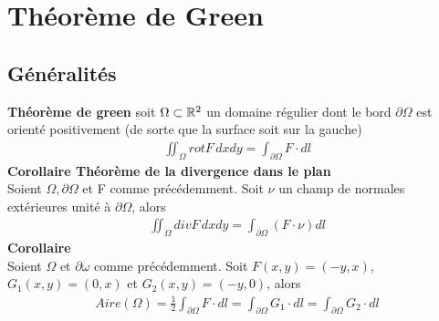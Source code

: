 \chapter[Théorème de Green]{Théorème de Green}

\section{Généralités}
\begin{myTheorem}
	{\bf Théorème de green} soit $\Omega \subset \mathbb{R}^2$ un domaine régulier dont le bord $\partial\Omega$ est orienté positivement (de sorte que la surface soit sur la gauche)
	\begin{eqnarray*}
		\iint_\Omega rot F \,dxdy=\int_{\partial\Omega}F\cdot dl
	\end{eqnarray*}
	{\bf Corollaire   Théorème de la divergence dans le plan}
	\\Soient $\Omega, \partial\Omega$ et F comme précédemment. Soit $\nu$ un champ de normales extérieures unité à $\partial\Omega$, alors
	\begin{eqnarray*}
		\iint_\Omega div F \,dxdy=\int_{\partial\Omega}(F\cdot\nu) dl
	\end{eqnarray*}
	{\bf Corollaire}
	\\Soient $\Omega$ et $\partial\omega$ comme précédemment. Soit $F(x,y)=(-y,x)$, $G_1(x,y)=(0,x)$ et $G_2(x,y)=(-y,0)$, alors
	\begin{eqnarray*}
		Aire(\Omega)=\frac{1}{2}\int_{\partial\Omega}F\cdot dl=\int_{\partial\Omega}G_1\cdot dl=\int_{\partial\Omega}G_2\cdot dl
	\end{eqnarray*}
\end{myTheorem}


